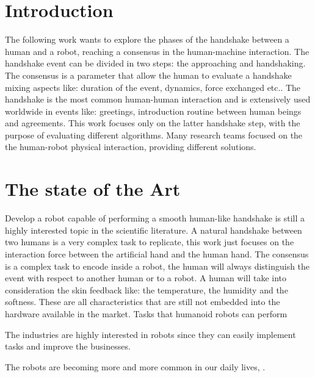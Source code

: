 \chapter*{Introduction}
The following work wants to explore the phases of the handshake between a human and a robot, reaching a consensus in the human-machine interaction. The handshake event can be divided in two steps: the approaching and handshaking. The consensus is a parameter that allow the human to evaluate a handshake mixing aspects like: duration of the event, dynamics, force exchanged etc.. 
The handshake is the most common human-human interaction and is extensively used worldwide in events like: greetings, introduction routine between human beings and agreements. 
This work focuses only on the latter handshake step, with the purpose of evaluating different algorithms.
Many research teams focused on the the human-robot physical interaction, providing different solutions. 


\chapter{The state of the Art}
Develop a robot capable of performing a smooth human-like handshake is still a highly interested topic in the scientific literature.
A natural handshake between two humans is a very complex task to replicate, this work just focuses on the interaction force between the artificial hand and the human hand.
The consensus is a complex task to encode inside a robot, the human will always distinguish the event with respect to another human or to a robot. A human will take into consideration the skin feedback like: the temperature, the humidity and the softness. These are all characteristics that are still not embedded into the hardware available in the market. Tasks that humanoid robots can perform 

The industries are highly interested in robots since they can easily implement tasks and improve the businesses.

\cite{facialexpressions}
\cite{espen}
\cite{mirrorgame}
\cite{papageorgiou}
The robots are becoming more and more common in our daily lives, 
.
\section{}
\section{}
\section{}
